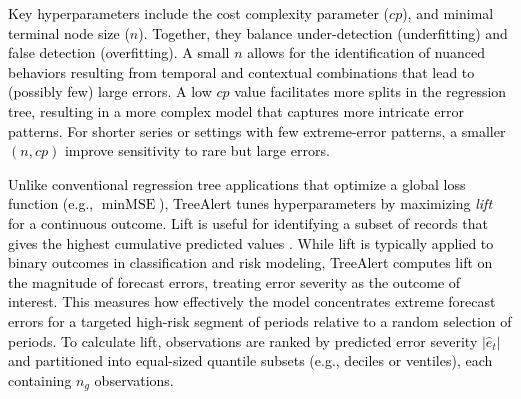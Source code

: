 \documentclass[12pt]{article}
\newcommand{\matt}[1]{\textcolor{black}{#1}}
\begin{document}
\matt{Key hyperparameters include the cost complexity parameter ($cp$), and minimal terminal node size ($n$). Together, they balance under-detection (underfitting) and false detection (overfitting). A small $n$ allows for the identification of nuanced behaviors resulting from temporal and contextual combinations that lead to (possibly few) large errors. A low $cp$ value facilitates more splits in the regression tree, resulting in a more complex model that captures more intricate error patterns. For shorter series or settings with few extreme-error patterns, a smaller $(n, cp)$ improve sensitivity to rare but large errors.}

\matt{Unlike conventional regression tree applications that optimize a global loss function (e.g., $\min \text{MSE}$), TreeAlert tunes hyperparameters by maximizing \emph{lift} for a continuous outcome. Lift is useful for identifying a subset of records that gives the highest cumulative predicted values \citep{shmueli2024machine}. While lift is typically applied to binary outcomes in classification and risk modeling, TreeAlert computes lift on the magnitude of forecast errors, treating error severity as the outcome of interest. This measures how effectively the model concentrates extreme forecast errors for a targeted high-risk segment of periods relative to a random selection of periods. To calculate lift, observations are ranked by predicted error severity $|\hat{e}_t|$ and partitioned into equal-sized quantile subsets (e.g., deciles or ventiles), each containing \( n_g \) observations. }%

\end{document}
